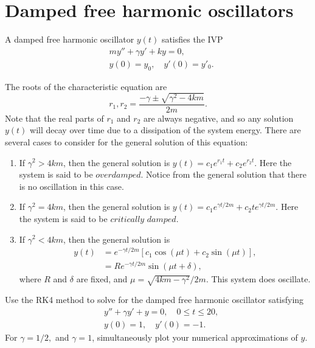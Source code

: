 \section*{Damped free harmonic oscillators} 
A damped free harmonic oscillator $y(t)$ satisfies the IVP
\begin{align*}
	&{}my'' + \gamma y' + ky = 0 ,\\
	&{}y(0) = y_0,\quad
	y'(0) = y'_0.
\end{align*}

The roots of the characteristic equation are \[r_1,r_2 = \frac{-\gamma \pm \sqrt{\gamma^2 -4km}}{2m} .\]
Note that the real parts of $r_1$ and $r_2$ are always negative, and so any solution $y(t)$ will decay over time due to a dissipation of the system energy. 
There are several cases to consider for the general solution of this equation:
\begin{enumerate}
\item If $\gamma^2 > 4km$, then the general solution is $y(t) = c_1 e^{r_1t} + c_2e^{r_2t}$. Here the system is said to be $\textit{overdamped}$. 
Notice from the general solution that there is no oscillation in this case.
\item If $\gamma^2 = 4km$, then the general solution is $y(t) = c_1 e^{\gamma t/2m} + c_2 te^{\gamma t/2m}$. Here the system is said to be $\textit{critically damped}$.
\item If $\gamma^2 < 4km$, then the general solution is
\begin{align*}
y(t) &= e^{-\gamma t/2m} \left[c_1\cos(\mu t) + c_2 \sin (\mu t)\right],\\
&= R e^{-\gamma t/2m}  \sin (\mu t + \delta),
\end{align*}
where $R$ and $\delta$ are fixed, and $\mu = \sqrt{4km-\gamma^2}/2m.$ This system does oscillate.
\end{enumerate}

\begin{problem}
Use the RK4 method to solve for the damped free harmonic oscillator satisfying 
\begin{align*}
&{}y'' +\gamma y'+ y = 0, \quad 0 \leq t \leq 20,\\
&{}y(0) = 1, \quad
y'(0) = -1.
\end{align*}
For $\gamma = 1/2,$ and $\gamma = 1$, simultaneously plot your numerical approximations of $y$.
\end{problem}

